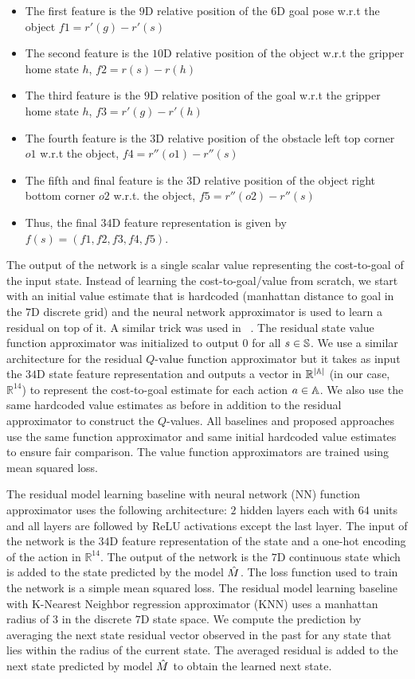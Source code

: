 \begin{itemize}
\begin{itemize}
	\end{itemize}
	\item The first feature is the $9$D relative position of the $6$D goal pose w.r.t the object $f1 = r'(g) - r'(s)$
	\item The second feature is the $10$D relative position of the object w.r.t the gripper home state $h$, $f2 = r(s) - r(h)$
	\item The third feature is the $9$D relative position of the goal w.r.t the gripper home state $h$, $f3 = r'(g) - r'(h)$
	\item The fourth feature is the $3$D relative position of the obstacle left top corner $o1$ w.r.t the object, $f4 = r''(o1) - r''(s)$
	\item The fifth and final feature is the $3$D relative position of the object right bottom corner $o2$ w.r.t. the object, $f5 = r''(o2) - r''(s)$
	\item Thus, the final $34$D feature representation is given by $f(s) = (f1, f2, f3, f4, f5)$.
\end{itemize}

The output of the network is a single scalar value representing the
cost-to-goal of the input state. Instead of learning the
cost-to-goal/value from scratch, we start with an initial value
estimate that is hardcoded (manhattan distance to goal in the $7$D
discrete grid) and the neural network approximator is used to learn a
residual on top of it. A similar trick was used in
\cmax{}~\cite{Vemula-RSS-20}. The residual state value function
approximator was initialized to output $0$ for all $s \in
\mathbb{S}$. We use a similar architecture for the residual $Q$-value
function approximator but it takes as input the $34$D state feature
representation and outputs a vector in $\mathbb{R}^{|\mathbb{A}|}$
(in our case, $\mathbb{R}^{14}$) to represent the cost-to-goal
estimate for each action $a \in \mathbb{A}$. We also use the same
hardcoded value estimates as before in addition to the residual
approximator to construct the $Q$-values. All baselines and proposed
approaches use the same function approximator and same initial
hardcoded value estimates to ensure fair comparison. The value
function approximators are trained using mean squared loss.


The residual model learning baseline with neural network (NN) function
approximator uses the following architecture: $2$ hidden layers each
with $64$ units and all layers are followed by ReLU activations except
the last layer. The input of the network is the $34$D feature
representation of the state and a one-hot encoding of the action in
$\mathbb{R}^14$. The output of the network is the $7$D continuous
state which is added to the state predicted by the model $\hat{M}$. The
loss function used to train the network is a simple mean squared
loss. The residual model learning baseline with K-Nearest Neighbor
regression approximator (KNN) uses a manhattan radius of $3$ in the
discrete $7$D state space. We compute the prediction by averaging the
next state residual vector observed in the past for any state that
lies within the radius of the current state. The averaged residual is
added to the next state predicted by model $\hat{M}$ to obtain the
learned next state.


